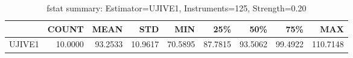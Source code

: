 \begin{table}[ht]
\centering
\caption{fstat summary: Estimator=UJIVE1, Instruments=125, Strength=0.20}
\begin{tabular}{lrrrrrrrr}
\toprule
 & COUNT & MEAN & STD & MIN & 25\% & 50\% & 75\% & MAX \\
\midrule
UJIVE1 & 10.0000 & 93.2533 & 10.9617 & 70.5895 & 87.7815 & 93.5062 & 99.4922 & 110.7148 \\
\bottomrule
\end{tabular}
\end{table}
